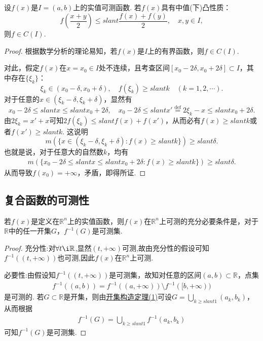 \documentclass[../../main.tex]{subfiles}
\begin{document}
\begin{example}
设\(f(x)\)是\(I = (a, b)\)上的实值可测函数. 若\(f(x)\)具有中值(下)凸性质：
\[f\left(\frac{x + y}{2}\right) \leqslant slant \frac{f(x) + f(y)}{2}, \quad x, y \in I,\]
则\(f \in C(I)\).
\end{example}
\begin{proof}
根据数学分析的理论易知，若\(f(x)\)是\(I\)上的有界函数，则\(f \in C(I)\).

对此，假定\(f(x)\)在\(x = x_0 \in I\)处不连续，且考查区间\([x_0 - 2\delta, x_0 + 2\delta] \subset I\)，其中存在\(\{\xi_k\}\)：
\[\xi_k \in (x_0 - \delta, x_0 + \delta), \quad f(\xi_k) \geqslant slant k \quad (k = 1,2,\cdots).\]
对于任意的\(x \in (\xi_k - \delta, \xi_k + \delta)\)，显然有
\[x_0 - 2\delta \leqslant slant x \leqslant slant x_0 + 2\delta, \quad x_0 - 2\delta \leqslant slant x' \stackrel{\text{def}}{=} 2\xi_k - x \leqslant slant x_0 + 2\delta.\]
由\(2\xi_k = x' + x\)可知\(2f(\xi_k) \leqslant slant f(x) + f(x')\)，从而必有\(f(x) \geqslant slant k\)或者\(f(x') \geqslant slant k\).
这说明
\[m(\{x \in (\xi_k - \delta, \xi_k + \delta) : f(x) \geqslant slant k\}) \geqslant slant \delta.\]
也就是说，对于任意大的自然数\(k\)，均有
\begin{align*}
m(\{x_0 - 2\delta \leqslant slant x \leqslant slant x_0 + 2\delta : f(x) \geqslant slant k\}) \geqslant slant \delta.
\end{align*}
从而导致\(f(x_0) = +\infty\)，矛盾，即得所证. 
\end{proof}



\subsection{复合函数的可测性}

\begin{lemma}\label{lemma:函数可测的充要条件1}
若\(f(x)\)是定义在\(\mathbb{R}^{n}\)上的实值函数，则\(f(x)\)在\(\mathbb{R}^{n}\)上可测的充分必要条件是，对于\(\mathbb{R}\)中的任一开集\(G\)，\(f^{-1}(G)\)是可测集.
\end{lemma}
\begin{proof}
{\heiti 充分性:}对$\forall t\i \mathbb{R}$,显然$(t,+\infty)$可测,故由充分性的假设可知$f^{-1}((t,+\infty))$也可测,因此$f(x)$在$\mathbb{R}^n$上可测.

{\heiti 必要性:}由假设知\(f^{-1}((t, +\infty))\)是可测集，故知对任意的区间\((a, b) \subset \mathbb{R}\)，点集
\begin{align*}
f^{-1}((a, b)) = f^{-1}((a, +\infty)) \setminus f^{-1}([b, +\infty))
\end{align*}
是可测的. 若\(G \subset \mathbb{R}\)是开集，则由\hyperref[theorem:开集构造定理]{开集构造定理(1)}可设\(G = \bigcup_{k \geqslant slant 1} (a_k, b_k)\)，从而根据
\begin{align*}
f^{-1}(G) = \bigcup_{k \geqslant slant 1} f^{-1}(a_k, b_k)
\end{align*}
可知\(f^{-1}(G)\)是可测集.
\end{proof}
\end{document}
